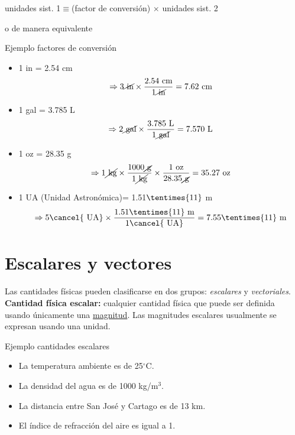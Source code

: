 \begin{center}
\textcolor{c4}{unidades sist. 1}$\equiv$\textcolor{c2}{(factor de conversi\'on)} $\times$  \textcolor{c5}{unidades sist. 2}
\end{center}

o de manera equivalente


\newpage
\begin{wwteorema}{Ejemplo factores de conversi\'on}
\begin{itemize}
\item 1 in = 2.54 cm $$\Rightarrow 3\cancel{\text{ in}}\times\frac{2.54\text{ cm}}{1\cancel{\text{ in}}}=7.62\text{ cm} $$
\item 1 gal = 3.785 L 
$$\Rightarrow 2\cancel{\text{ gal}}\times\frac{3.785\text{ L}}{1\cancel{\text{ gal}}}=7.570\text{ L} $$
\item 1 oz = 28.35 g
$$\Rightarrow 1\cancel{\text{ kg}}\times\frac{1000\cancel{ \text{ g}}}{1 \cancel{\text{ kg}}}\times\frac{1 \text{ oz}}{28.35\cancel{\text{ g}}}=35.27 \text{ oz} $$
\item 1 UA (Unidad Astron\'omica)= 1.51$\tentimes{11}$ m
$$\Rightarrow 5\cancel{\text{ UA}}\times\frac{1.51\tentimes{11}\text{ m}}{1\cancel{\text{ UA}}}=7.55\tentimes{11}\text{ m} $$
\end{itemize}
\end{wwteorema}

\newpage
\section{Escalares y vectores}

Las cantidades f\'isicas pueden clasificarse en dos grupos: \textit{escalares} y \textit{vectoriales}.\\[.5cm]

\noindent\textbf{Cantidad f\'isica escalar:} cualquier cantidad f\'isica que puede ser definida usando \'unicamente una \underline{magnitud}. Las magnitudes escalares usualmente se expresan usando una unidad. 

\begin{wwteorema}{Ejemplo cantidades escalares}
\begin{itemize}
\item La temperatura ambiente es de 25$^{\circ}\mbox{C}$.
\item La densidad del agua es de 1000 kg/m$^{3}.$
\item La distancia entre San Jos\'e y Cartago es de 13 km.
\item El \'indice de refracci\'on del aire es igual a 1.
\end{itemize}
\end{wwteorema}

